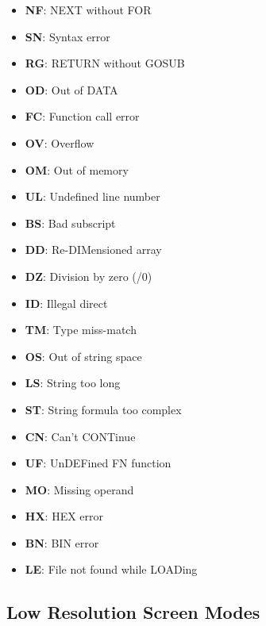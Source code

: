    \begin{itemize}
        \item \textbf{NF}: NEXT without FOR
        \item \textbf{SN}: Syntax error
        \item \textbf{RG}: RETURN without GOSUB
        \item \textbf{OD}: Out of DATA
        \item \textbf{FC}: Function call error
        \item \textbf{OV}: Overflow
        \item \textbf{OM}: Out of memory
        \item \textbf{UL}: Undefined line number
        \item \textbf{BS}: Bad subscript
        \item \textbf{DD}: Re-DIMensioned array
        \item \textbf{DZ}: Division by zero (/0)
        \item \textbf{ID}: Illegal direct
        \item \textbf{TM}: Type miss-match
        \item \textbf{OS}: Out of string space
        \item \textbf{LS}: String too long
        \item \textbf{ST}: String formula too complex
        \item \textbf{CN}: Can't CONTinue
        \item \textbf{UF}: UnDEFined FN function
        \item \textbf{MO}: Missing operand
        \item \textbf{HX}: HEX error
        \item \textbf{BN}: BIN error
        \item \textbf{LE}: File not found while LOADing
    \end{itemize}

    \subsection{Low Resolution Screen Modes}
    \label{sec:vdpscrmodes}

